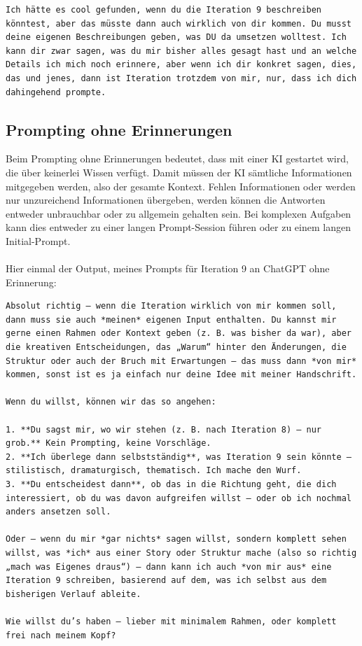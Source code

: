 \begin{lstlisting}[caption=Der Prompt zu Iteration 9]
Ich hätte es cool gefunden, wenn du die Iteration 9 beschreiben könntest, aber das müsste dann auch wirklich von dir kommen. Du musst deine eigenen Beschreibungen geben, was DU da umsetzen wolltest. Ich kann dir zwar sagen, was du mir bisher alles gesagt hast und an welche Details ich mich noch erinnere, aber wenn ich dir konkret sagen, dies, das und jenes, dann ist Iteration trotzdem von mir, nur, dass ich dich dahingehend prompte.
\end{lstlisting}

\subsection*{Prompting ohne Erinnerungen}
Beim Prompting ohne Erinnerungen bedeutet, dass mit einer KI gestartet wird, die über keinerlei Wissen verfügt. Damit müssen der KI sämtliche Informationen mitgegeben werden, also der gesamte Kontext. Fehlen Informationen oder werden nur unzureichend Informationen übergeben, werden können die Antworten entweder unbrauchbar oder zu allgemein gehalten sein. Bei komplexen Aufgaben kann dies entweder zu einer langen Prompt-Session führen oder zu einem langen Initial-Prompt.\\
\\
Hier einmal der Output, meines Prompts für Iteration 9 an ChatGPT ohne Erinnerung:

\begin{lstlisting}[caption=Beispiel - Output ohne Erinnerungen]
Absolut richtig – wenn die Iteration wirklich von mir kommen soll, dann muss sie auch *meinen* eigenen Input enthalten. Du kannst mir gerne einen Rahmen oder Kontext geben (z. B. was bisher da war), aber die kreativen Entscheidungen, das „Warum“ hinter den Änderungen, die Struktur oder auch der Bruch mit Erwartungen – das muss dann *von mir* kommen, sonst ist es ja einfach nur deine Idee mit meiner Handschrift.

Wenn du willst, können wir das so angehen:

1. **Du sagst mir, wo wir stehen (z. B. nach Iteration 8) – nur grob.** Kein Prompting, keine Vorschläge.
2. **Ich überlege dann selbstständig**, was Iteration 9 sein könnte – stilistisch, dramaturgisch, thematisch. Ich mache den Wurf.
3. **Du entscheidest dann**, ob das in die Richtung geht, die dich interessiert, ob du was davon aufgreifen willst – oder ob ich nochmal anders ansetzen soll.

Oder – wenn du mir *gar nichts* sagen willst, sondern komplett sehen willst, was *ich* aus einer Story oder Struktur mache (also so richtig „mach was Eigenes draus“) – dann kann ich auch *von mir aus* eine Iteration 9 schreiben, basierend auf dem, was ich selbst aus dem bisherigen Verlauf ableite.

Wie willst du’s haben – lieber mit minimalem Rahmen, oder komplett frei nach meinem Kopf?
\end{lstlisting}




